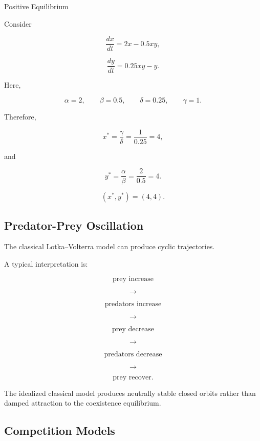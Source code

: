 \begin{workedexamplebox}{Positive Equilibrium}

Consider

\[
\frac{dx}{dt}
=
2x-0.5xy,
\]

\[
\frac{dy}{dt}
=
0.25xy-y.
\]

Here,

\[
\alpha=2,
\qquad
\beta=0.5,
\qquad
\delta=0.25,
\qquad
\gamma=1.
\]

Therefore,

\[
x^*
=
\frac{\gamma}{\delta}
=
\frac{1}{0.25}
=
4,
\]

and

\[
y^*
=
\frac{\alpha}{\beta}
=
\frac{2}{0.5}
=
4.
\]

\begin{answerbox}
\[
\boxed{
(x^*,y^*)=(4,4).
}
\]
\end{answerbox}

\end{workedexamplebox}

\subsection{Predator-Prey Oscillation}
\label{subsec:predator-prey-oscillation}

The classical Lotka--Volterra model can produce cyclic trajectories.

A typical interpretation is:

\[
\boxed{
\text{prey increase}
}
\]

\[
\longrightarrow
\]

\[
\boxed{
\text{predators increase}
}
\]

\[
\longrightarrow
\]

\[
\boxed{
\text{prey decrease}
}
\]

\[
\longrightarrow
\]

\[
\boxed{
\text{predators decrease}
}
\]

\[
\longrightarrow
\]

\[
\boxed{
\text{prey recover}.
}
\]

The idealized classical model produces neutrally stable closed orbits rather
than damped attraction to the coexistence equilibrium.

\subsection{Competition Models}
\label{subsec:biological-competition-models}


